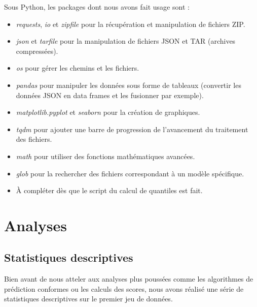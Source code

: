 \documentclass[a4paper,12pt]{article}
\begin{document}
\vspace{0.2cm}

Sous Python, les packages dont nous avons fait usage sont :
\begin{itemize}
    \item \textit{requests}, \textit{io}  et \textit{zipfile} pour la récupération et manipulation de fichiers ZIP.
    \item \textit{json} et \textit{tarfile} pour la manipulation de fichiers JSON et TAR (archives compressées).
    \item \textit{os} pour gérer les chemins et les fichiers.
    \item \textit{pandas} pour manipuler les données sous forme de tableaux (convertir les données JSON en data frames et les fusionner par exemple).
    \item \textit{matplotlib.pyplot} et \textit{seaborn} pour la création de graphiques.
    \item \textit{tqdm} pour ajouter une barre de progression de l’avancement du traitement des fichiers.
    \item \textit{math} pour utiliser des fonctions mathématiques avancées.
    \item \textit{glob} pour la rechercher des fichiers correspondant à un modèle spécifique.
    \item À compléter dès que le script du calcul de quantiles est fait. 
\end{itemize}



\section{Analyses}


\subsection{Statistiques descriptives}

Bien avant de nous atteler aux analyses plus poussées comme les algorithmes de prédiction conformes ou les calculs des scores, nous avons réalisé une série de statistiques descriptives sur le premier jeu de données. 

\vspace{2.0cm}
\end{document}
